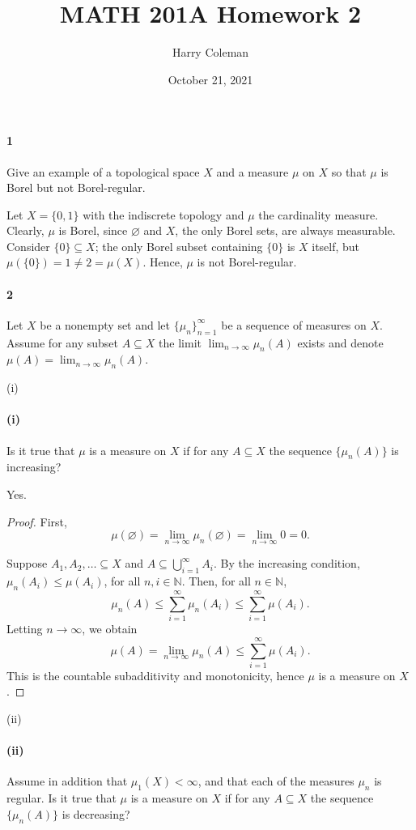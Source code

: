 \documentclass[12pt]{article}
\renewcommand{\maketitle}{\thispagestyle{title}}
\newlength{\myparskip}
\newenvironment{fullbox}{\begin{lrbox}{\savefullbox}\begin{minipage}{\dimexpr\textwidth-2\fboxsep\relax}\setlength{\parskip}{\myparskip}}{\end{minipage}\end{lrbox}\framebox[\textwidth]{\usebox{\savefullbox}}}
\newenvironment{pbox}[1][]{\begin{fullbox}\ifx#1\empty\else\paragraph{#1}\fi}{\end{fullbox}}
\newcommand{\N}{\mathbb{N}}
\renewcommand{\emptyset}{\varnothing}
\newcommand{\<}{\langle}
\renewcommand{\>}{\rangle}
\begin{document}
\title{MATH 201A Homework 2}
\author{Harry Coleman}
\date{October 21, 2021}
\maketitle

\begin{pbox}[1]
    Give an example of a topological space $X$ and a measure $\mu$ on $X$ so that $\mu$ is Borel but not Borel-regular.
\end{pbox}

Let $X = \{0, 1\}$ with the indiscrete topology and $\mu$ the cardinality measure. Clearly, $\mu$ is Borel, since $\emptyset$ and $X$, the only Borel sets, are always measurable. Consider $\{0\} \subseteq X$; the only Borel subset containing $\{0\}$ is $X$ itself, but $\mu(\{0\}) = 1 \ne 2 = \mu(X)$. Hence, $\mu$ is not Borel-regular.

\newpage
\begin{pbox}[2]
    Let $X$ be a nonempty set and let $\{\mu_n\}_{n=1}^{\infty}$ be a sequence of measures on $X$. Assume for any subset $A \subseteq X$ the limit $\lim_{n \to \infty} \mu_n(A)$ exists and denote $\mu(A) = \lim_{n \to \infty} \mu_n(A)$.
\end{pbox}

\begin{pbox}[(i)]
    Is it true that $\mu$ is a measure on $X$ if for any $A \subseteq X$ the sequence $\{\mu_n(A)\}$ is increasing?
\end{pbox}

Yes.

\begin{proof}
    First,
    \[
        \mu(\emptyset)
            = \lim_{n \to \infty} \mu_n(\emptyset)
            = \lim_{n \to \infty} 0
            = 0.
    \]
    

    Suppose $A_1, A_2, \ldots \subseteq X$ and $A \subseteq \bigcup_{i=1}^{\infty} A_i$. By the increasing condition, $\mu_n(A_i) \leq \mu(A_i)$, for all $n, i \in \N$. Then, for all $n \in \N$,
    \[
        \mu_n(A)
            \leq \sum_{i=1}^{\infty} \mu_n(A_i)
            \leq \sum_{i=1}^{\infty} \mu(A_i).
    \]
    Letting $n \to \infty$, we obtain
    \[
        \mu(A)
            = \lim_{n \to \infty} \mu_n(A)
            \leq \sum_{i=1}^{\infty} \mu(A_i).
    \]
    This is the countable subadditivity and monotonicity, hence $\mu$ is a measure on $X$.

\end{proof}

\begin{pbox}[(ii)]
    Assume in addition that $\mu_1(X) < \infty$, and that each of the measures $\mu_n$ is regular. Is it true that $\mu$ is a measure on $X$ if for any $A \subseteq X$ the sequence $\{\mu_n(A)\}$ is decreasing?
\end{pbox}
\end{document}
